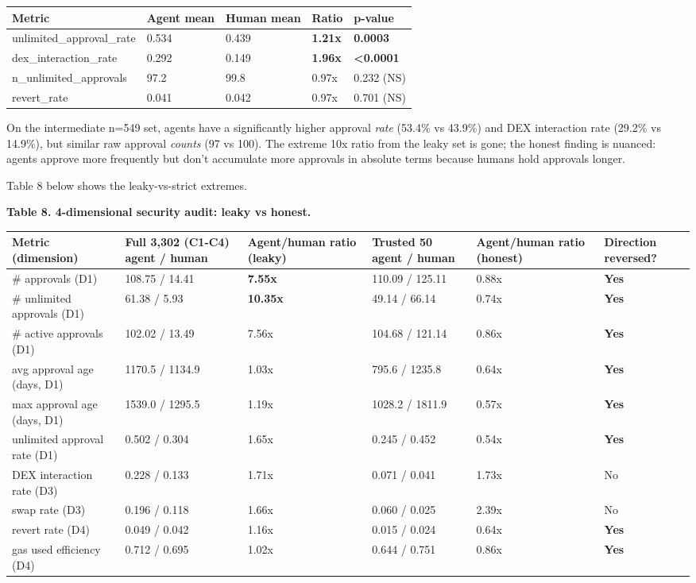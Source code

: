 \documentclass[sigconf,nonacm=false]{acmart}
\begin{document}
\begin{table}[h]
\centering
\small
\begin{tabular}{lllll}
\toprule
Metric & Agent mean & Human mean & Ratio & p-value \\
\midrule
unlimited\_approval\_rate & 0.534 & 0.439 & \textbf{1.21x} & \textbf{0.0003} \\
dex\_interaction\_rate & 0.292 & 0.149 & \textbf{1.96x} & \textbf{<0.0001} \\
n\_unlimited\_approvals & 97.2 & 99.8 & 0.97x & 0.232 (NS) \\
revert\_rate & 0.041 & 0.042 & 0.97x & 0.701 (NS) \\
\bottomrule
\end{tabular}
\end{table}

On the intermediate n=549 set, agents have a significantly higher approval \textit{rate} (53.4\% vs 43.9\%) and DEX interaction rate (29.2\% vs 14.9\%), but similar raw approval \textit{counts} (97 vs 100). The extreme 10x ratio from the leaky set is gone; the honest finding is nuanced: agents approve more frequently but don't accumulate more approvals in absolute terms because humans hold approvals longer.

Table 8 below shows the leaky-vs-strict extremes.

\textbf{Table 8. 4-dimensional security audit: leaky vs honest.}

\begin{table}[h]
\centering
\small
\begin{tabular}{llllll}
\toprule
Metric (dimension) & Full 3,302 (C1-C4) agent / human & Agent/human ratio (leaky) & Trusted 50 agent / human & Agent/human ratio (honest) & Direction reversed? \\
\midrule
\# approvals (D1) & 108.75 / 14.41 & \textbf{7.55x} & 110.09 / 125.11 & 0.88x & \textbf{Yes} \\
\# unlimited approvals (D1) & 61.38 / 5.93 & \textbf{10.35x} & 49.14 / 66.14 & 0.74x & \textbf{Yes} \\
\# active approvals (D1) & 102.02 / 13.49 & 7.56x & 104.68 / 121.14 & 0.86x & \textbf{Yes} \\
avg approval age (days, D1) & 1170.5 / 1134.9 & 1.03x & 795.6 / 1235.8 & 0.64x & \textbf{Yes} \\
max approval age (days, D1) & 1539.0 / 1295.5 & 1.19x & 1028.2 / 1811.9 & 0.57x & \textbf{Yes} \\
unlimited approval rate (D1) & 0.502 / 0.304 & 1.65x & 0.245 / 0.452 & 0.54x & \textbf{Yes} \\
DEX interaction rate (D3) & 0.228 / 0.133 & 1.71x & 0.071 / 0.041 & 1.73x & No \\
swap rate (D3) & 0.196 / 0.118 & 1.66x & 0.060 / 0.025 & 2.39x & No \\
revert rate (D4) & 0.049 / 0.042 & 1.16x & 0.015 / 0.024 & 0.64x & \textbf{Yes} \\
gas used efficiency (D4) & 0.712 / 0.695 & 1.02x & 0.644 / 0.751 & 0.86x & \textbf{Yes} \\
\bottomrule
\end{tabular}
\end{table}
\end{document}
